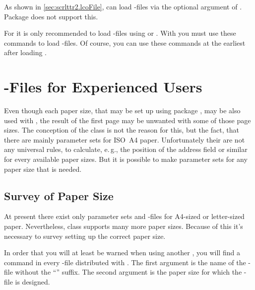 As shown in
\autoref{sec:scrlttr2.lcoFile},  can load -files via
the optional argument of . Package 
does not support this.

\begin{Declaration}
\end{Declaration}
For  it is only recommended to load -files using
 or
. With  you must
use these commands to load -files. Of course, you can use these
commands at the earliest after loading .%
\EndIndexGroup
%
\EndIndexGroup


\section{-Files for Experienced Users}
\BeginIndexGroup
{}%
%

%
Even though each paper size, that may be set up using package
, may be also used with , the result of the
first page may be unwanted with some of those page sizes. The conception of
the class is not the reason for this, but the fact, that there are mainly
parameter sets for ISO~A4 paper. Unfortunately their are not any universal
rules, to calculate, e.\,g., the position of the address field or similar for
every available paper sizes. But it is possible to make parameter sets for any
paper size that is needed.%
%
%


\subsection{Survey of Paper Size}

At present there exist only parameter sets and -files for A4-sized
or letter-sized paper. Nevertheless, class  supports many more
paper sizes. Because of this it's necessary to survey setting up the correct
paper size.

\begin{Declaration}
\end{Declaration}
In order that you will at least be warned when using another , you will find a  command in every
-file distributed with {\KOMAScript}. The first argument is the name
of the -file without the ``'' suffix. The second argument
is the paper size for which the -file is designed.

